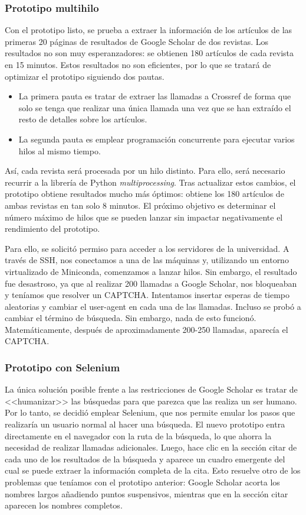 \subsubsection{Prototipo multihilo}

Con el prototipo listo, se prueba a extraer la información de los artículos de las primeras 20 páginas de resultados de Google Scholar de dos revistas. Los resultados no son muy esperanzadores: se obtienen 180 artículos de cada revista en 15 minutos. Estos resultados no son eficientes, por lo que se tratará de optimizar el prototipo siguiendo dos pautas. 

\begin{itemize}
    \item La primera pauta es tratar de extraer las llamadas a Crossref de forma que solo se tenga que realizar una única llamada una vez que se han extraído el resto de detalles sobre los artículos.
    \item La segunda pauta es emplear programación concurrente para ejecutar varios hilos al mismo tiempo.
\end{itemize}

Así, cada revista será procesada por un hilo distinto. Para ello, será necesario recurrir a la librería de Python \textit{multiprocessing}. Tras actualizar estos cambios, el prototipo obtiene resultados mucho más óptimos: obtiene los 180 artículos de ambas revistas en tan solo 8 minutos. El próximo objetivo es determinar el número máximo de hilos que se pueden lanzar sin impactar negativamente el rendimiento del prototipo.

Para ello, se solicitó permiso para acceder a los servidores de la universidad. A través de SSH, nos conectamos a una de las máquinas y, utilizando un entorno virtualizado de Miniconda, comenzamos a lanzar hilos. Sin embargo, el resultado fue desastroso, ya que al realizar 200 llamadas a Google Scholar, nos bloqueaban y teníamos que resolver un CAPTCHA. Intentamos insertar esperas de tiempo aleatorias y cambiar el user-agent en cada una de las llamadas. Incluso se probó a cambiar el término de búsqueda. Sin embargo, nada de esto funcionó. Matemáticamente, después de aproximadamente 200-250 llamadas, aparecía el CAPTCHA.


\subsubsection{Prototipo con Selenium}
La única solución posible frente a las restricciones de Google Scholar es tratar de <<humanizar>> las búsquedas para que parezca que las realiza un ser humano. Por lo tanto, se decidió emplear Selenium, que nos permite emular los pasos que realizaría un usuario normal al hacer una búsqueda. El nuevo prototipo entra directamente en el navegador con la ruta de la búsqueda, lo que ahorra la necesidad de realizar llamadas adicionales. Luego, hace clic en la sección citar de cada uno de los resultados de la búsqueda y aparece un cuadro emergente del cual se puede extraer la información completa de la cita. Esto resuelve otro de los problemas que teníamos con el prototipo anterior: Google Scholar acorta los nombres largos añadiendo puntos suspensivos, mientras que en la sección citar aparecen los nombres completos. 


